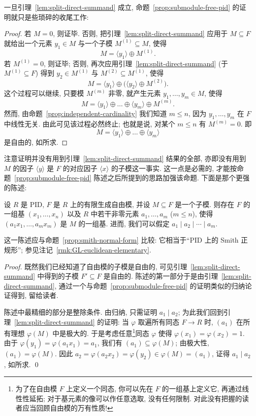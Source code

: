 一旦引理~\ref{lem:split-direct-summand} 成立, 命题~\ref{prop:submodule-free-pid} 的证明就只是些琐碎的收尾工作:

\begin{proof}
若 $M=0$, 则证毕. 否则, 把引理~\ref{lem:split-direct-summand} 应用于 $M\subseteq F$ 就给出一个元素 $y_1\in M$ 与一个子模 $M^{(1)}\subseteq M$, 使得
$$
M=\langle y_1\rangle\oplus M^{(1)}.
$$
若 $M^{(1)}=0$, 则证毕; 否则, 再次应用引理~\ref{lem:split-direct-summand} (于 $M^{(1)}\subseteq F$) 得到 $y_2\in M^{(1)}$ 与 $M^{(2)}\subseteq M^{(1)}$, 使得
$$
M=\langle y_1\rangle\oplus\bigl(\langle y_2\rangle\oplus M^{(2)}\bigr).
$$
这个过程可以继续, 只要模 $M^{(m)}$ 非零, 就产生元素 $y_1,\ldots,y_m\in M$, 使得
$$
M=\langle y_1\rangle\oplus\dots\oplus\langle y_m\rangle\oplus M^{(m)}.
$$
然而, 由命题~\ref{prop:independent-cardinality} 我们知道 $m\le n$, 因为 $y_1,\ldots,y_m$ 在 $F$ 中线性无关. 由此可见该过程必然终止; 也就是说, 对某个 $m\le n$ 有 $M^{(m)}=0$. 即
$$
M=\langle y_1\rangle\oplus\dots\oplus\langle y_m\rangle
$$
是自由的, 如所求.
\end{proof}

注意证明并没有用到引理~\ref{lem:split-direct-summand} 结果的全部, 亦即没有用到 $M$ 的因子 $\langle y\rangle$ 是 $F$ 的对应因子 $\langle x\rangle$ 的子模这一事实. 这一点是必需的, 才能按命题~\ref{prop:submodule-free-pid} 陈述之后所提到的思路加强该命题. 下面是那个更强的陈述:

\begin{corollary}\label{cor:smith-pid}
设 $R$ 是 PID, $F$ 是 $R$ 上的有限生成自由模, 并设 $M\subseteq F$ 是一个子模. 则存在 $F$ 的一组基 $(x_1,\ldots,x_n)$ 以及 $R$ 中若干非零元素 $a_1,\ldots,a_m$ ($m\le n$), 使得 $(a_1x_1,\ldots,a_mx_m)$ 是 $M$ 的一组基. 进而, 我们可以假定 $a_1\mid a_2\mid\cdots\mid a_m$.
\end{corollary}

这一陈述应与命题~\ref{prop:smith-normal-form} 比较: 它相当于``PID 上的 Smith 正规形''; 参见注记~\ref{rmk:GL-euclidean-elementary}.

\begin{proof}
既然我们已经知道了自由模的子模是自由的, 可见引理~\ref{lem:split-direct-summand} 中得到的子模 $F'\subseteq F$ 是自由的. 陈述的第一部分于是由引理~\ref{lem:split-direct-summand}, 通过一个与命题~\ref{prop:submodule-free-pid} 的证明类似的归纳论证得到, 留给读者.

陈述中最精细的部分是整除条件. 由归纳, 只需证明 $a_1\mid a_2$; 为此我们回到引理~\ref{lem:split-direct-summand} 的证明: 当 $\varphi$ 取遍所有同态 $F\to R$ 时, $(a_1)$ 在所有理想 $\varphi(M)$ 中是极大的. 于是考虑任意\footnote{为了在自由模 $F$ 上定义一个同态, 你可以先在 $F$ 的一组基上定义它, 再通过线性性延拓; 对于基元素的像可以作任意选取, 没有任何限制. 对此没有把握的读者应当回顾自由模的万有性质!}同态 $\varphi$ 使得 $\varphi(x_1)=\varphi(x_2)=1$. 由于 $\varphi(y_1)=\varphi(a_1x_1)=a_1$, 我们有 $(a_1)\subseteq\varphi(M)$; 由极大性, $(a_1)=\varphi(M)$. 因此 $a_2=\varphi(a_2x_2)=\varphi(y_2)\in\varphi(M)=(a_1)$, 证得 $a_1\mid a_2$, 如所求. \qed
\end{proof}

